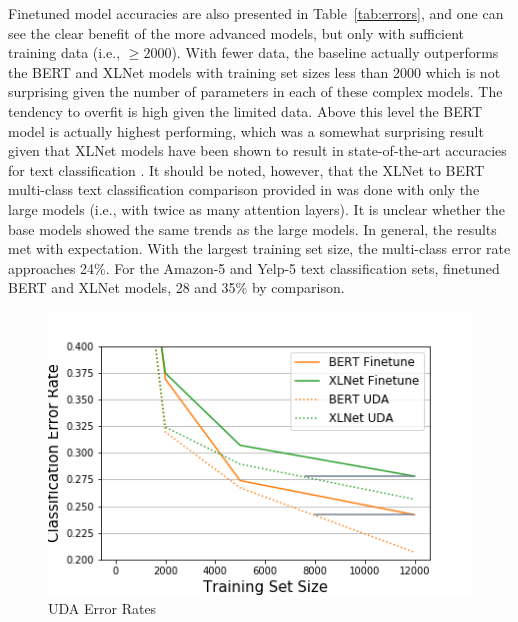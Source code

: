 \documentclass[twoside,twocolumn,10pt]{article}
\begin{document}
Finetuned model accuracies are also presented in Table~\ref{tab:errors}, and one can see the clear benefit of the more advanced models, but only with sufficient training data (i.e., $\geq 2000$). With fewer data, the baseline actually outperforms the BERT and XLNet models with training set sizes less than 2000 which is not surprising given the number of parameters in each of these complex models. The tendency to overfit is high given the limited data. Above this level the BERT model is actually highest performing, which was a somewhat surprising result given that XLNet models have been shown to result in state-of-the-art accuracies for text classification \cite{Yang:2019}. It should be noted, however, that the XLNet to BERT multi-class text classification comparison provided in \cite{Yang:2019} was done with only the large models (i.e., with twice as many attention layers).  It is unclear whether the base models showed the same trends as the large models.  In general, the results met with expectation. With the largest training set size, the multi-class error rate approaches 24\%. For the Amazon-5 and Yelp-5 text classification sets, finetuned BERT \cite{Vaswani:2017} and XLNet \cite{Yang:2019} models, 28 and 35\% by comparison.

\begin{figure}
	\includegraphics[width=\linewidth]{uda_errors.png}
	\caption{UDA Error Rates}
	\label{fig:uda}
\end{figure}
\end{document}
